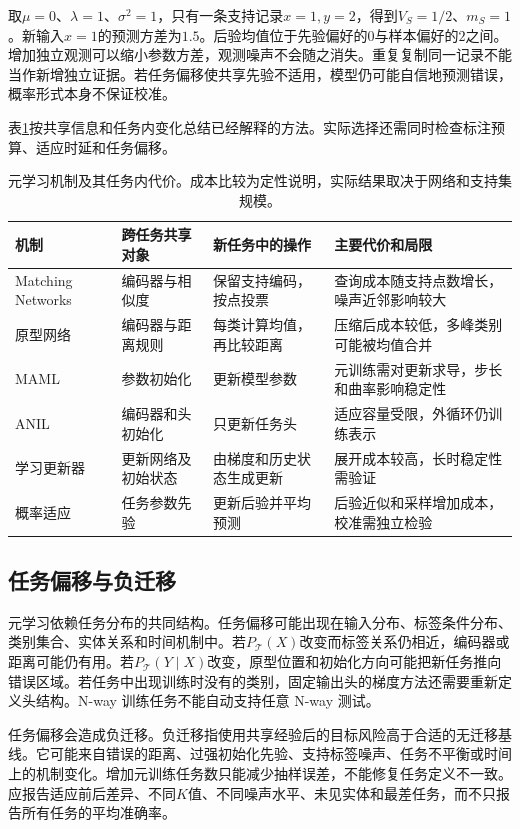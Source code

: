 取$\mu=0$、$\lambda=1$、$\sigma^2=1$，只有一条支持记录$x=1,y=2$，得到$V_S=1/2$、$m_S=1$。新输入$x=1$的预测方差为$1.5$。后验均值位于先验偏好的$0$与样本偏好的$2$之间。增加独立观测可以缩小参数方差，观测噪声不会随之消失。重复复制同一记录不能当作新增独立证据。若任务偏移使共享先验不适用，模型仍可能自信地预测错误，概率形式本身不保证校准。

表\ref{tab:meta-mechanisms}按共享信息和任务内变化总结已经解释的方法。实际选择还需同时检查标注预算、适应时延和任务偏移。
\begin{table}[htbp]
\centering\small
\caption{元学习机制及其任务内代价。成本比较为定性说明，实际结果取决于网络和支持集规模。}
\label{tab:meta-mechanisms}
\begin{tabular}{>{\raggedright\arraybackslash}m{1.6cm}>{\raggedright\arraybackslash}m{2.2cm}>{\raggedright\arraybackslash}m{2.4cm}>{\raggedright\arraybackslash}m{3.0cm}}
\toprule
机制 & 跨任务共享对象 & 新任务中的操作 & 主要代价和局限\\
\midrule
Matching Networks & 编码器与相似度 & 保留支持编码，按点投票 & 查询成本随支持点数增长，噪声近邻影响较大\\
原型网络 & 编码器与距离规则 & 每类计算均值，再比较距离 & 压缩后成本较低，多峰类别可能被均值合并\\
MAML & 参数初始化 & 更新模型参数 & 元训练需对更新求导，步长和曲率影响稳定性\\
ANIL & 编码器和头初始化 & 只更新任务头 & 适应容量受限，外循环仍训练表示\\
学习更新器 & 更新网络及初始状态 & 由梯度和历史状态生成更新 & 展开成本较高，长时稳定性需验证\\
概率适应 & 任务参数先验 & 更新后验并平均预测 & 后验近似和采样增加成本，校准需独立检验\\
\bottomrule
\end{tabular}
\end{table}

\subsection{任务偏移与负迁移}

元学习依赖任务分布的共同结构。任务偏移可能出现在输入分布、标签条件分布、类别集合、实体关系和时间机制中。若$P_{\mathcal T}(X)$改变而标签关系仍相近，编码器或距离可能仍有用。若$P_{\mathcal T}(Y\mid X)$改变，原型位置和初始化方向可能把新任务推向错误区域。若任务中出现训练时没有的类别，固定输出头的梯度方法还需要重新定义头结构。N-way 训练任务不能自动支持任意 N-way 测试。

任务偏移会造成负迁移。负迁移指使用共享经验后的目标风险高于合适的无迁移基线。它可能来自错误的距离、过强初始化先验、支持标签噪声、任务不平衡或时间上的机制变化。增加元训练任务数只能减少抽样误差，不能修复任务定义不一致。应报告适应前后差异、不同$K$值、不同噪声水平、未见实体和最差任务，而不只报告所有任务的平均准确率。

